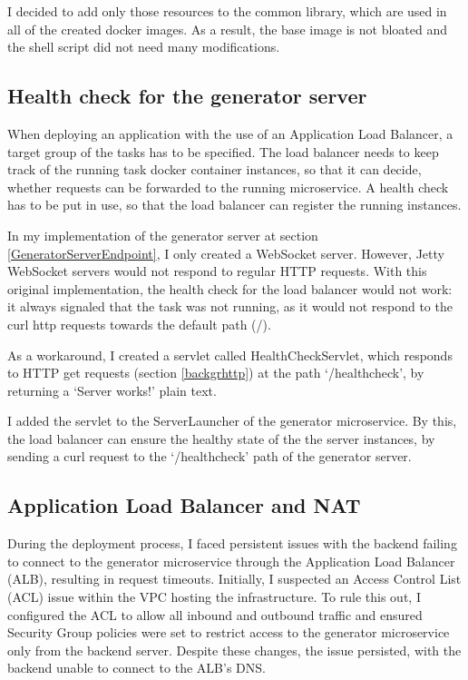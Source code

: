 		I decided to add only those resources to the common library, which are used in all of the created docker images. 
		As a result, the base image is not bloated and the shell script did not need many modifications.

	\subsection{Health check for the generator server} \label{healthcheck}
		When deploying an application with the use of an Application Load Balancer, a target group of the tasks has to be specified.
		The load balancer needs to keep track of the running task docker container instances, so that it can decide, whether requests can be 
		forwarded to the running microservice. A health check has to be put in use, so that the load balancer can register the running instances.

		In my implementation of the generator server at section \ref{GeneratorServerEndpoint}, I only created a WebSocket server. However, Jetty 
		WebSocket servers would not respond to regular HTTP requests. With this original implementation, the health check for the load balancer would
		not work: it always signaled that the task was not running, as it would not respond to the curl http requests towards the default path (/).

		As a workaround, I created a servlet called HealthCheckServlet, which responds to HTTP get requests (section \ref{backgrhttp}) at the path `/healthcheck',
		by returning a `Server works!' plain text.

		I added the servlet to the ServerLauncher of the generator microservice. By this, the load balancer can ensure the healthy state of the 
		the server instances, by sending a curl request to the `/healthcheck' path of the generator server.

	\subsection{Application Load Balancer and NAT} \label{ALB NAT}
		During the deployment process, I faced persistent issues with the backend failing to connect to the generator microservice 
		through the Application Load Balancer (ALB), resulting in request timeouts. Initially, I suspected an Access Control List (ACL) 
		issue within the VPC hosting the infrastructure. To rule this out, I configured the ACL to allow all inbound and outbound traffic 
		and ensured Security Group policies were set to restrict access to the generator microservice only from the backend server. 
		Despite these changes, the issue persisted, with the backend unable to connect to the ALB's DNS.

